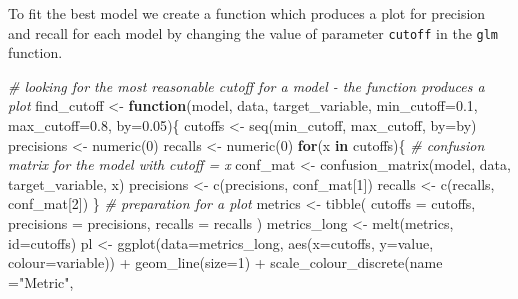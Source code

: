 \documentclass[
]{report}
\newenvironment{Shaded}{\begin{snugshade}}{\end{snugshade}}
\newcommand{\AttributeTok}[1]{\textcolor[rgb]{0.77,0.63,0.00}{#1}}
\newcommand{\CommentTok}[1]{\textcolor[rgb]{0.56,0.35,0.01}{\textit{#1}}}
\newcommand{\ControlFlowTok}[1]{\textcolor[rgb]{0.13,0.29,0.53}{\textbf{#1}}}
\newcommand{\DecValTok}[1]{\textcolor[rgb]{0.00,0.00,0.81}{#1}}
\newcommand{\FloatTok}[1]{\textcolor[rgb]{0.00,0.00,0.81}{#1}}
\newcommand{\FunctionTok}[1]{\textcolor[rgb]{0.00,0.00,0.00}{#1}}
\newcommand{\NormalTok}[1]{#1}
\newcommand{\OtherTok}[1]{\textcolor[rgb]{0.56,0.35,0.01}{#1}}
\newcommand{\SpecialCharTok}[1]{\textcolor[rgb]{0.00,0.00,0.00}{#1}}
\newcommand{\StringTok}[1]{\textcolor[rgb]{0.31,0.60,0.02}{#1}}
\begin{document}
To fit the best model we create a function which produces a plot for
precision and recall for each model by changing the value of parameter
\texttt{cutoff} in the \texttt{glm} function.

\begin{Shaded}
\begin{Highlighting}[]
\CommentTok{\# looking for the most reasonable cutoff for a model {-} the function produces a plot}
\NormalTok{find\_cutoff }\OtherTok{\textless{}{-}} \ControlFlowTok{function}\NormalTok{(model, data, target\_variable, }\AttributeTok{min\_cutoff=}\FloatTok{0.1}\NormalTok{, }\AttributeTok{max\_cutoff=}\FloatTok{0.8}\NormalTok{, }\AttributeTok{by=}\FloatTok{0.05}\NormalTok{)\{}
\NormalTok{  cutoffs }\OtherTok{\textless{}{-}} \FunctionTok{seq}\NormalTok{(min\_cutoff, max\_cutoff, }\AttributeTok{by=}\NormalTok{by)}
\NormalTok{  precisions }\OtherTok{\textless{}{-}} \FunctionTok{numeric}\NormalTok{(}\DecValTok{0}\NormalTok{)}
\NormalTok{  recalls }\OtherTok{\textless{}{-}} \FunctionTok{numeric}\NormalTok{(}\DecValTok{0}\NormalTok{)}
  \ControlFlowTok{for}\NormalTok{(x }\ControlFlowTok{in}\NormalTok{ cutoffs)\{}
    \CommentTok{\# confusion matrix for the model with cutoff = x}
\NormalTok{    conf\_mat }\OtherTok{\textless{}{-}} \FunctionTok{confusion\_matrix}\NormalTok{(model, data, target\_variable, x) }
\NormalTok{    precisions }\OtherTok{\textless{}{-}} \FunctionTok{c}\NormalTok{(precisions, conf\_mat[}\DecValTok{1}\NormalTok{])}
\NormalTok{    recalls }\OtherTok{\textless{}{-}} \FunctionTok{c}\NormalTok{(recalls, conf\_mat[}\DecValTok{2}\NormalTok{])}
\NormalTok{  \}}
  \CommentTok{\# preparation for a plot}
\NormalTok{  metrics }\OtherTok{\textless{}{-}} \FunctionTok{tibble}\NormalTok{(}
    \AttributeTok{cutoffs =}\NormalTok{ cutoffs,}
    \AttributeTok{precisions =}\NormalTok{ precisions,}
    \AttributeTok{recalls =}\NormalTok{ recalls}
\NormalTok{  )}
\NormalTok{  metrics\_long }\OtherTok{\textless{}{-}} \FunctionTok{melt}\NormalTok{(metrics, }\AttributeTok{id=}\StringTok{\textquotesingle{}cutoffs\textquotesingle{}}\NormalTok{)}
\NormalTok{  pl }\OtherTok{\textless{}{-}} \FunctionTok{ggplot}\NormalTok{(}\AttributeTok{data=}\NormalTok{metrics\_long, }\FunctionTok{aes}\NormalTok{(}\AttributeTok{x=}\NormalTok{cutoffs, }\AttributeTok{y=}\NormalTok{value, }\AttributeTok{colour=}\NormalTok{variable)) }\SpecialCharTok{+} 
    \FunctionTok{geom\_line}\NormalTok{(}\AttributeTok{size=}\DecValTok{1}\NormalTok{) }\SpecialCharTok{+}
    \FunctionTok{scale\_colour\_discrete}\NormalTok{(}\AttributeTok{name  =}\StringTok{"Metric"}\NormalTok{,}

\end{Highlighting}
\end{Shaded}
\end{document}
